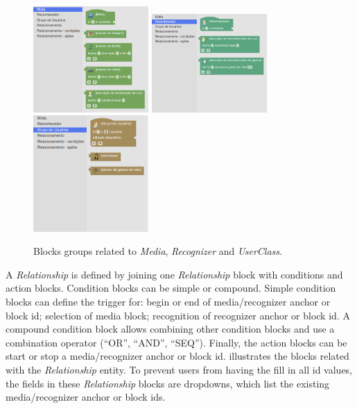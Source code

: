 \begin{figure}[!ht]
\begin{center}
	\includegraphics[width=4.4cm, keepaspectratio]{img/img13a.png}
	\includegraphics[width=4.4cm, keepaspectratio]{img/img13b.png}
	\includegraphics[width=4.4cm, keepaspectratio]{img/img13c.png}
	\caption{Blocks groups related to \textit{Media}, \textit{Recognizer} and
	\textit{UserClass}.}
	\label{fig:blocksgroups}
	\captionvspace
\end{center}
\end{figure}

A \textit{Relationship} is defined by joining one \textit{Relationship} block
with conditions and action blocks. Condition blocks can be simple or
compound. Simple condition blocks can define the trigger for: begin or end of
media/recognizer anchor or block id; selection of media block; recognition of
recognizer anchor or block id. A compound condition block allows combining other
condition blocks and use a combination operator (“OR”, “AND”, “SEQ”). Finally,
the action blocks can be start or stop a media/recognizer anchor or block id.
 illustrates the blocks related with the \textit{Relationship}
entity. To prevent users from having the fill in all id values, the fields in
these \textit{Relationship} blocks are dropdowns, which list the existing
media/recognizer anchor or block ids.

